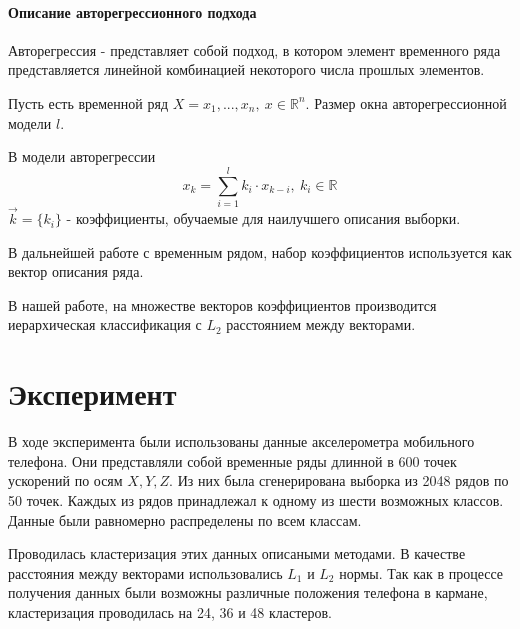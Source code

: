 \documentclass[12pt,twoside]{article}
\begin{document}
        \paragraph{Описание авторегрессионного подхода}
            Авторегрессия - представляет собой подход, в котором элемент временного ряда представляется линейной комбинацией некоторого числа прошлых элементов.

            Пусть есть временной ряд $X = x_1, ... , x_n, \ x \in \mathbb{R}^n$.
            Размер окна авторегрессионной модели $l$.

            В модели авторегрессии $$ x_k = \sum\limits_{i=1}^{l} k_i \cdot x_{k-i}, \ k_i \in \mathbb{R} $$
            $\vec{k} = \{k_i\}$ \-- коэффициенты, обучаемые для наилучшего описания выборки.

            В дальнейшей работе с временным рядом, набор коэффициентов используется как вектор описания ряда.

            В нашей работе, на множестве векторов коэффициентов производится иерархическая классификация с $L_2$ расстоянием между векторами.

  
			
    \section{Эксперимент}
        
        В ходе эксперимента были использованы данные акселерометра мобильного телефона.
        Они представляли собой временные ряды длинной в 600 точек ускорений по осям $X, Y, Z$.
        Из них была сгенерирована выборка из 2048 рядов по 50 точек.
        Каждых из рядов принадлежал к одному из шести возможных классов. Данные были равномерно распределены по всем классам.

        Проводилась кластеризация этих данных описаными методами. В качестве расстояния между векторами использовались $L_1$  и $L_2$ нормы.
        Так как в процессе получения данных были возможны различные положения телефона в кармане, кластеризация проводилась на 24, 36 и 48 кластеров.
\end{document}
